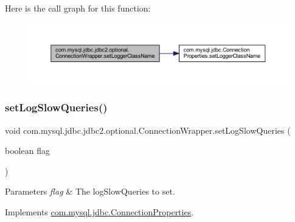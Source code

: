 Here is the call graph for this function\+:
\nopagebreak
\begin{figure}[H]
\begin{center}
\leavevmode
\includegraphics[width=350pt]{classcom_1_1mysql_1_1jdbc_1_1jdbc2_1_1optional_1_1_connection_wrapper_a83bbb6fcf7e7526415776d20aff135fd_cgraph}
\end{center}
\end{figure}
\mbox{\label{classcom_1_1mysql_1_1jdbc_1_1jdbc2_1_1optional_1_1_connection_wrapper_a392f4a58a5aa8c42317181640bdb6575}} 
\subsubsection{\texorpdfstring{set\+Log\+Slow\+Queries()}{setLogSlowQueries()}}
{\footnotesize\ttfamily void com.\+mysql.\+jdbc.\+jdbc2.\+optional.\+Connection\+Wrapper.\+set\+Log\+Slow\+Queries (\begin{DoxyParamCaption}\item[{boolean}]{flag }\end{DoxyParamCaption})}


\begin{DoxyParams}{Parameters}
{\em flag} & The log\+Slow\+Queries to set. \\
\hline
\end{DoxyParams}


Implements \mbox{\hyperlink{interfacecom_1_1mysql_1_1jdbc_1_1_connection_properties_a7dd83438187fa5956f663b84a604dce3}{com.\+mysql.\+jdbc.\+Connection\+Properties}}.

